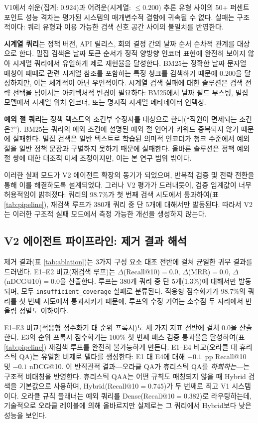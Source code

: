 \documentclass[11pt, a4paper]{article}
\begin{document}
V1에서 쉬운(집계: 0.924)과 어려운(시계열: $\leq 0.200$) 추론 유형 사이의 50+ 퍼센트포인트 성능 격차는 평가된 시스템의 매개변수적 결함에 귀속될 수 없다. 실패는 구조적이다: 쿼리 유형과 이용 가능한 검색 신호 공간 사이의 불일치를 반영한다.

\textbf{시계열 쿼리}는 정책 버전, API 릴리스, 회의 결정 간의 날짜 순서 순차적 관계를 대상으로 한다. 밀집 검색은 날짜 토큰 순서가 정적 양방향 인코더 표현에 완전히 보이지 않아 시계열 쿼리에서 유일하게 제로 재현율을 달성한다. BM25는 정확한 날짜 문자열 매칭이 때때로 관련 시계열 참조를 포함하는 특정 청크를 검색하기 때문에 0.200을 달성하지만, 이는 체계적이 아닌 우연적이다. 시계열 검색 실패에 대한 솔루션은 검색 전략 선택을 넘어서는 아키텍처적 변경이 필요하다: BM25에서 날짜 필드 부스팅, 밀집 모델에서 시계열 위치 인코더, 또는 명시적 시계열 메타데이터 인덱싱.

\textbf{예외 절 쿼리}는 정책 텍스트의 조건부 수정자를 대상으로 한다(``직원이 면제되는 조건은?''). BM25는 쿼리의 예외 조건에 설명된 예외 절 언어가 키워드 중복되지 않기 때문에 실패한다. 밀집 검색은 일반 텍스트로 학습된 의미적 인코더가 청크 수준에서 예외 절을 일반 정책 문장과 구별하지 못하기 때문에 실패한다. 올바른 솔루션은 정책 예외 절 쌍에 대한 대조적 미세 조정이지만, 이는 본 연구 범위 밖이다.

이러한 실패 모드가 V2 에이전트 확장의 동기가 되었으며, 반복적 검증 및 전략 전환을 통해 이를 해결하도록 설계되었다. 그러나 V2 평가가 드러내듯이, 검증 임계값이 너무 허용적임이 밝혀졌다: 쿼리의 98.7\%가 첫 번째 검색 시도에서 통과하여(표 \ref{tab:pipeline}), 재검색 루프가 380개 쿼리 중 단 5개에 대해서만 발동된다. 따라서 V2는 이러한 구조적 실패 모드에서 측정 가능한 개선을 생성하지 않는다.

\subsection{V2 에이전트 파이프라인: 제거 결과 해석}

제거 결과(표 \ref{tab:ablation})는 3가지 구성 요소 대조 전반에 걸쳐 균일한 귀무 결과를 드러낸다. E1--E2 비교(재검색 루프)는 $\Delta$(Recall@10)$=0.0$, $\Delta$(MRR)$=0.0$, $\Delta$(nDCG@10)$=0.0$을 산출한다. 루프는 380개 쿼리 중 단 5개(1.3\%)에 대해서만 발동되며, 모두 \texttt{insufficient\_coverage} 실패로 분류된다. 적응형 점수화기가 98.7\%의 쿼리를 첫 번째 시도에서 통과시키기 때문에, 루프의 수정 기여는 소수점 두 자리에서 반올림 정밀도 이하이다.

E1--E3 비교(적응형 점수화기 대 순위 프록시)도 세 가지 지표 전반에 걸쳐 0.0을 산출한다. E3의 순위 프록시 점수화기는 100\% 첫 번째 패스 검증 통과율을 달성하여(표 \ref{tab:pipeline}) 재검색 루프를 완전히 불가능하게 만든다. E1--E4 비교(오라클 대 휴리스틱 QA)는 유일한 비제로 델타를 생성한다: E1 대 E4에 대해 $-0.1$~pp Recall@10 및 $-0.1$ nDCG@10. 이 반직관적 결과---오라클 QA가 휴리스틱 QA를 \textit{하회하는}---는 구조적 비대칭을 반영한다. 휴리스틱 QAA는 어떤 규칙도 매칭되지 않을 때 Hybrid 검색을 기본값으로 사용하며, Hybrid(Recall@10$={0.745}$)가 두 번째로 최고 V1 시스템이다. 오라클 규칙 플래너는 예외 쿼리를 Dense(Recall@10$={0.382}$)로 라우팅하는데, 기술적으로 오라클 레이블에 의해 올바르지만 실제로는 그 쿼리에서 Hybrid보다 낮은 성능을 보인다.
\end{document}
